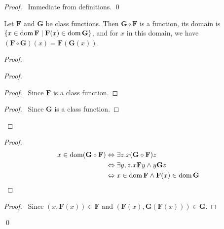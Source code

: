 \begin{proof}
    \pf\ Immediate from definitions. \qed
\end{proof}

\begin{theorem}
    \label{theorem:comp_function}
    Let $\mathbf{F}$ and $\mathbf{G}$ be class functions. Then $\mathbf{G} \circ \mathbf{F}$ is a function, its domain
    is $\{ x \in \operatorname{dom} \mathbf{F} \mid \mathbf{F}(x) \in \operatorname{dom} \mathbf{G} \}$, and for $x$ in this domain,
    we have $(\mathbf{F} \circ \mathbf{G})(x) = \mathbf{F}(\mathbf{G}(x))$.
\end{theorem}

\begin{proof}
    \pf
    \begin{proof}
        \begin{proof}
            \pf\ Since $\mathbf{F}$ is a class function.
        \end{proof}
        \begin{proof}
            \pf\ Since $\mathbf{G}$ is a class function.
        \end{proof}
    \end{proof}
    \begin{proof}
        \pf
        \begin{align*}
            x \in \operatorname{dom} (\mathbf{G} \circ \mathbf{F}) & \Leftrightarrow \exists z. x(\mathbf{G} \circ \mathbf{F})z \\
            & \Leftrightarrow \exists y, z. x\mathbf{F}y \wedge y\mathbf{G}z \\
            & \Leftrightarrow x \in \operatorname{dom} \mathbf{F} \wedge \mathbf{F}(x) \in \operatorname{dom} \mathbf{G}
        \end{align*}
    \end{proof}
    \begin{proof}
        \pf\ Since $(x,\mathbf{F}(x)) \in \mathbf{F}$ and $(\mathbf{F}(x),\mathbf{G}(\mathbf{F}(x))) \in \mathbf{G}$.
    \end{proof}
    \qed
\end{proof}


